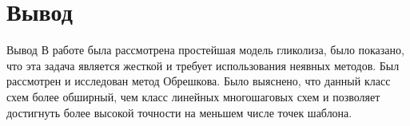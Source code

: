 \documentclass[ignorenonframetext,unicode,handout, 9pt]{beamer}
\begin{document}
\begin{frame}[t]
\begin{figure}[htbp]
\center{\texttt{[image: RK4]}}
\label{fig:image}
\end{figure}
\end{frame}

\begin{frame}[t]
\begin{figure}[htbp]
\center{\texttt{[image: FT]}}
\label{fig:image}
\end{figure}
\end{frame}

\begin{frame}[t]
\begin{figure}[htbp]
\center{\texttt{[image: PC]}}
\label{fig:image}
\end{figure}
\end{frame}

\section{Вывод}
\begin{frame}{Вывод}
В работе была рассмотрена простейшая модель гликолиза, было показано, что эта задача является жесткой и требует использования неявных методов. Был рассмотрен и исследован метод Обрешкова. Было выяснено, что данный класс схем более обширный, чем класс линейных многошаговых схем и позволяет достигнуть более высокой точности на меньшем числе точек шаблона.
\end{frame}
\end{document}
